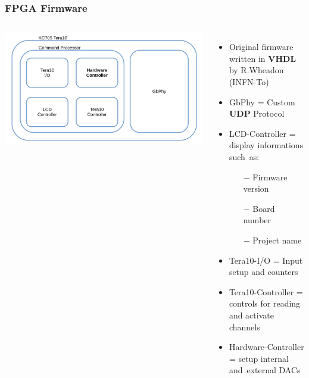 \documentclass[aspectratio=169]{beamer}
\begin{document}
	\begin{frame}
		\frametitle{FPGA Firmware}
		\begin{columns}
			\begin{center}
				\includegraphics[width=1.0 \textwidth]{IMG/Tera10kc705.pdf}
			\end{center}
			\begin{itemize}
				\item Original firmware written in \textbf{VHDL} by R.Wheadon (INFN-To) 
				\item GbPhy = Custom \textbf{UDP} Protocol
				\item LCD-Controller = display informations such~as:
					\begin{itemize}
						\item[$-$] Firmware version
						\item[$-$] Board number
						\item[$-$] Project name
					\end{itemize}
				\item Tera10-I/O = Input setup and counters
				\item Tera10-Controller = controls for reading and activate channels
				\item Hardware-Controller = setup internal and~external DACs
			\end{itemize}
		\end{columns}
	\end{frame}
\end{document}
